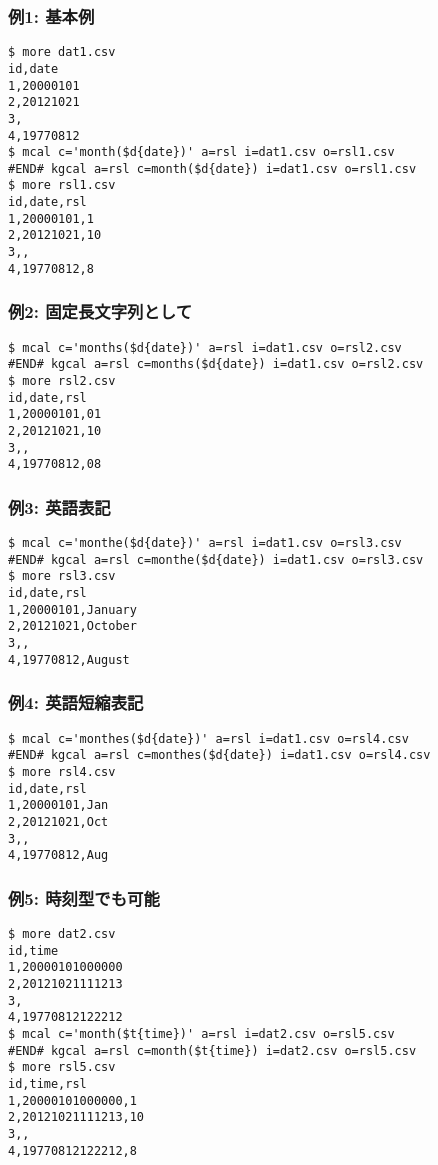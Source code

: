 \subsubsection*{例1: 基本例}



\begin{Verbatim}[baselinestretch=0.7,frame=single]
$ more dat1.csv
id,date
1,20000101
2,20121021
3,
4,19770812
$ mcal c='month($d{date})' a=rsl i=dat1.csv o=rsl1.csv
#END# kgcal a=rsl c=month($d{date}) i=dat1.csv o=rsl1.csv
$ more rsl1.csv
id,date,rsl
1,20000101,1
2,20121021,10
3,,
4,19770812,8
\end{Verbatim}
\subsubsection*{例2: 固定長文字列として}



\begin{Verbatim}[baselinestretch=0.7,frame=single]
$ mcal c='months($d{date})' a=rsl i=dat1.csv o=rsl2.csv
#END# kgcal a=rsl c=months($d{date}) i=dat1.csv o=rsl2.csv
$ more rsl2.csv
id,date,rsl
1,20000101,01
2,20121021,10
3,,
4,19770812,08
\end{Verbatim}
\subsubsection*{例3: 英語表記}



\begin{Verbatim}[baselinestretch=0.7,frame=single]
$ mcal c='monthe($d{date})' a=rsl i=dat1.csv o=rsl3.csv
#END# kgcal a=rsl c=monthe($d{date}) i=dat1.csv o=rsl3.csv
$ more rsl3.csv
id,date,rsl
1,20000101,January
2,20121021,October
3,,
4,19770812,August
\end{Verbatim}
\subsubsection*{例4: 英語短縮表記}



\begin{Verbatim}[baselinestretch=0.7,frame=single]
$ mcal c='monthes($d{date})' a=rsl i=dat1.csv o=rsl4.csv
#END# kgcal a=rsl c=monthes($d{date}) i=dat1.csv o=rsl4.csv
$ more rsl4.csv
id,date,rsl
1,20000101,Jan
2,20121021,Oct
3,,
4,19770812,Aug
\end{Verbatim}
\subsubsection*{例5: 時刻型でも可能}



\begin{Verbatim}[baselinestretch=0.7,frame=single]
$ more dat2.csv
id,time
1,20000101000000
2,20121021111213
3,
4,19770812122212
$ mcal c='month($t{time})' a=rsl i=dat2.csv o=rsl5.csv
#END# kgcal a=rsl c=month($t{time}) i=dat2.csv o=rsl5.csv
$ more rsl5.csv
id,time,rsl
1,20000101000000,1
2,20121021111213,10
3,,
4,19770812122212,8
\end{Verbatim}
